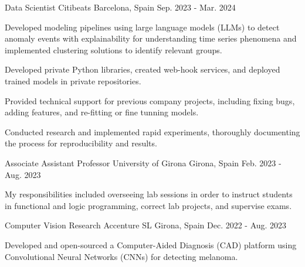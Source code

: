 

\begin{cventries}


  \cventry
  {Data Scientist} %
  {Citibeats} %
  {Barcelona, Spain} %
  {Sep. 2023 - Mar. 2024} %
  {
  \begin{cvitems}
\item {Developed modeling pipelines using large language models (LLMs) to detect anomaly events with explainability for understanding time series phenomena and implemented clustering solutions to identify relevant groups.}
\item {Developed private Python libraries, created web-hook services, and deployed trained models in private repositories.}
\item {Provided technical support for previous company projects, including fixing bugs, adding features, and re-fitting or fine tunning models.}
\item {Conducted research and implemented rapid experiments, thoroughly documenting the process for reproducibility and results.}
  \end{cvitems}
}


  \cventry
  {Associate Assistant Professor} %
  {University of Girona} %
  {Girona, Spain} %
  {Feb. 2023 - Aug. 2023} %
  {
    \begin{cvitems} %
    \item {My responsibilities included overseeing lab
      sessions in order to instruct students in functional and logic programming,
    correct lab projects, and supervise exams.}
    \end{cvitems}
    }


    \cventry
    {Computer Vision Research} %
    {Accenture SL} %
    {Girona, Spain} %
    {Dec. 2022 - Aug. 2023} %
    {
    \begin{cvitems}
  \item {Developed and open-sourced a Computer-Aided Diagnosis (CAD) platform using Convolutional Neural Networks (CNNs) for detecting melanoma.}
    \end{cvitems}
    }


\end{cventries}
